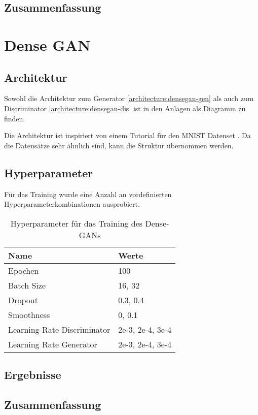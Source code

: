 \subsection{Zusammenfassung}

\section{Dense GAN}
\subsection{Architektur}
Sowohl die Architektur zum Generator \cref{architecture:densegan-gen} als auch zum Discriminator \cref{architecture:densegan-dis} ist in den Anlagen als Diagramm zu finden.

Die Architektur ist inspiriert von einem Tutorial für den MNIST Datenset \cite{inspiration-dense-gan}.
Da die Datensätze sehr ähnlich sind, kann die Struktur übernommen werden.

\subsection{Hyperparameter}
Für das Training wurde eine Anzahl an vordefinierten Hyperparameterkombinationen ausprobiert.

\begin{table}[H]
	\centering
	\begin{tabular}{l l}
		Name                        & Werte            \\ \hline
		Epochen                     & 100              \\
		Batch Size                  & 16, 32           \\
		Dropout                     & 0.3, 0.4         \\
		Smoothness                  & 0, 0.1           \\
		Learning Rate Discriminator & 2e-3, 2e-4, 3e-4 \\
		Learning Rate Generator     & 2e-3, 2e-4, 3e-4
	\end{tabular}
	\caption{Hyperparameter für das Training des Dense-GANs}
\end{table}

\subsection{Ergebnisse}
\subsection{Zusammenfassung}

